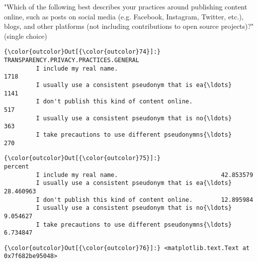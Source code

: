 \documentclass[11pt]{article}
\begin{document}
"Which of the following best describes your practices around publishing
content online, such as posts on social media (e.g. Facebook, Instagram,
Twitter, etc.), blogs, and other platforms (not including contributions
to open source projects)?" (single choice)


            \begin{Verbatim}[commandchars=\\\{\}]
{\color{outcolor}Out[{\color{outcolor}74}]:}                                                     TRANSPARENCY.PRIVACY.PRACTICES.GENERAL
         I include my real name.                                                               1718
         I usually use a consistent pseudonym that is ea{\ldots}                                    1141
         I don't publish this kind of content online.                                           517
         I usually use a consistent pseudonym that is no{\ldots}                                     363
         I take precautions to use different pseudonymns{\ldots}                                     270
\end{Verbatim}
        

            \begin{Verbatim}[commandchars=\\\{\}]
{\color{outcolor}Out[{\color{outcolor}75}]:}                                                       percent
         I include my real name.                             42.853579
         I usually use a consistent pseudonym that is ea{\ldots}  28.460963
         I don't publish this kind of content online.        12.895984
         I usually use a consistent pseudonym that is no{\ldots}   9.054627
         I take precautions to use different pseudonymns{\ldots}   6.734847
\end{Verbatim}
        

            \begin{Verbatim}[commandchars=\\\{\}]
{\color{outcolor}Out[{\color{outcolor}76}]:} <matplotlib.text.Text at 0x7f682be95048>
\end{Verbatim}
        
    \begin{center}
    \end{center}
    { \hspace*{\fill} \\}
    
\end{document}
